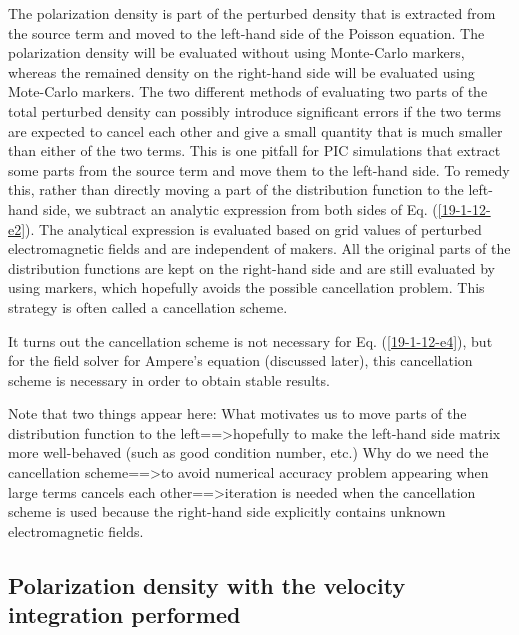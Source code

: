 \documentclass{llncs}
\begin{document}
The polarization density is part of the perturbed density that is extracted
from the source term and moved to the left-hand side of the Poisson equation.
The polarization density will be evaluated without using Monte-Carlo markers,
whereas the remained density on the right-hand side will be evaluated using
Mote-Carlo markers. The two different methods of evaluating two parts of the
total perturbed density can possibly introduce significant errors if the two
terms are expected to cancel each other and give a small quantity that is much
smaller than either of the two terms. This is one pitfall for PIC simulations
that extract some parts from the source term and move them to the left-hand
side. To remedy this, rather than directly moving a part of the distribution
function to the left-hand side, we subtract an analytic expression from both
sides of Eq. (\ref{19-1-12-e2}). The analytical expression is evaluated based
on grid values of perturbed electromagnetic fields and are independent of
makers. All the original parts of the distribution functions are kept on the
right-hand side and are still evaluated by using markers, which hopefully
avoids the possible cancellation problem. This strategy is often called a
cancellation scheme.

It turns out the cancellation scheme is not necessary for Eq.
(\ref{19-1-12-e4}), but for the field solver for Ampere's equation (discussed
later), this cancellation scheme is necessary in order to obtain stable
results.

Note that two things appear here: What motivates us to move parts of the
distribution function to the left==>hopefully to make the left-hand side
matrix more well-behaved (such as good condition number, etc.) Why do we need
the cancellation scheme==>to avoid numerical accuracy problem appearing when
large terms cancels each other==>iteration is needed when the cancellation
scheme is used because the right-hand side explicitly contains unknown
electromagnetic fields.

\subsection{Polarization density with the velocity integration
performed}\label{21-8-22-a3}
\end{document}
